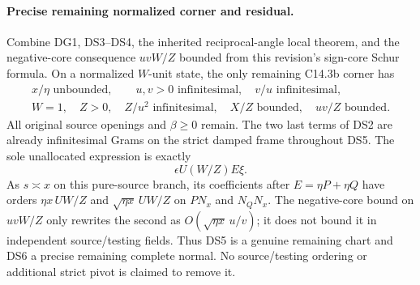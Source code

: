 \paragraph{Precise remaining normalized corner and residual.}
Combine DG1, DS3--DS4, the inherited reciprocal-angle local theorem,
and the negative-core consequence $uvW/Z$ bounded from this
revision's sign-core Schur formula. On a normalized $W$-unit state,
the only remaining C14.3b corner has
\[
 \begin{gathered}
 x/\eta\text{ unbounded},\qquad
 u,v>0\text{ infinitesimal},\quad v/u\text{ infinitesimal},\\
 W=1,\quad Z>0,\quad Z/u^2\text{ infinitesimal},\quad
 X/Z\text{ bounded},\quad uv/Z\text{ bounded}.
 \end{gathered}                                             \tag{DS5}
\]
All original source openings and $\beta\ge0$ remain. The two last
terms of DS2 are already infinitesimal Grams on the strict damped
frame throughout DS5. The sole unallocated expression is exactly
\[
                         \epsilon U(W/Z)E\xi.               \tag{DS6}
\]
As $s\asymp x$ on this pure-source branch, its coefficients after
$E=\eta P+\eta Q$ have orders
$\eta x\,UW/Z$ and $\sqrt{\eta x}\,UW/Z$ on $PN_x$ and
$N_QN_x$. The negative-core bound on $uvW/Z$ only rewrites the second
as $O(\sqrt{\eta x}\,u/v)$; it does not bound it in independent
source/testing fields. Thus DS5 is a genuine remaining chart and
DS6 a precise remaining complete normal. No source/testing ordering
or additional strict pivot is claimed to remove it.
